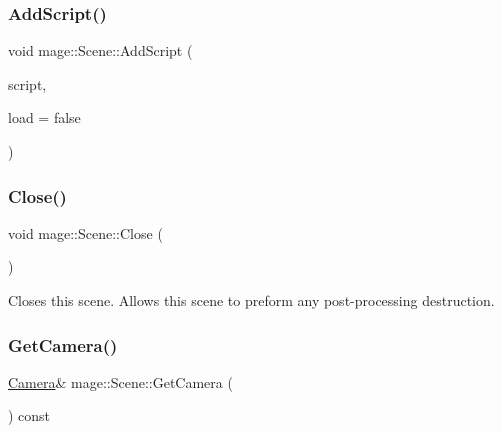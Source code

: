 \subsubsection{\texorpdfstring{Add\+Script()}{AddScript()}}
{\footnotesize\ttfamily void mage\+::\+Scene\+::\+Add\+Script (\begin{DoxyParamCaption}\item[{\hyperlink{namespacemage_a1e01ae66713838a7a67d30e44c67703e}{Shared\+Ptr}$<$ \hyperlink{classmage_1_1_behavior_script}{Behavior\+Script} $>$}]{script,  }\item[{bool}]{load = {\ttfamily false} }\end{DoxyParamCaption})}

\hypertarget{classmage_1_1_scene_afcdedaac5ecab7dcbbb180426054aaa5}{}\label{classmage_1_1_scene_afcdedaac5ecab7dcbbb180426054aaa5} 
\subsubsection{\texorpdfstring{Close()}{Close()}}
{\footnotesize\ttfamily void mage\+::\+Scene\+::\+Close (\begin{DoxyParamCaption}{ }\end{DoxyParamCaption})\hspace{0.3cm}{\ttfamily [virtual]}}

Closes this scene. Allows this scene to preform any post-\/processing destruction. \hypertarget{classmage_1_1_scene_a8b2ad419541a51353d6f56ba12f43d79}{}\label{classmage_1_1_scene_a8b2ad419541a51353d6f56ba12f43d79} 
\subsubsection{\texorpdfstring{Get\+Camera()}{GetCamera()}}
{\footnotesize\ttfamily \hyperlink{classmage_1_1_camera}{Camera}\& mage\+::\+Scene\+::\+Get\+Camera (\begin{DoxyParamCaption}{ }\end{DoxyParamCaption}) const}

\hypertarget{classmage_1_1_scene_a251ff8f6ce0da5c55ee31e3450b5fb9a}{}\label{classmage_1_1_scene_a251ff8f6ce0da5c55ee31e3450b5fb9a} 
